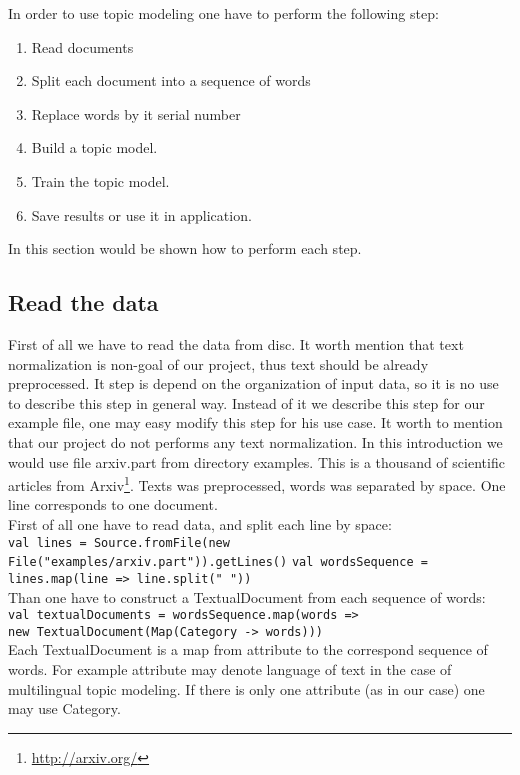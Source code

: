 In order to use topic modeling one have to perform the following step:
\begin{enumerate}
    \item Read documents
    \item Split each document into a sequence of words
    \item Replace words by it serial number
    \item Build a topic model.
    \item Train the topic model.
    \item Save results or use it in application. 
\end{enumerate}

In this section would be shown how to perform each step. 
\subsection{Read the data}
    First of all we have to read the data from disc. It worth mention that text normalization is non\--goal of our project, thus text should be already preprocessed. 
    It step is depend on the organization of input data, so it is
    no use to describe this step in general way. Instead of it we describe this step for our example file, one may easy modify this step for his use case. %
    It worth to mention that our project do not performs any text normalization.
    In this introduction we would use file arxiv.part from directory examples. This is a thousand of scientific articles
    from Arxiv\footnote{\url{http://arxiv.org/}}. Texts was preprocessed, words was separated by space. One line corresponds
    to one document.\\
    First of all one have to read data, and split each line by space:\\
    \texttt{val lines = Source.fromFile(new File("examples/arxiv.part")).getLines()}
    \texttt{val wordsSequence = lines.map(line => line.split(" "))}\\
    Than one have to construct a TextualDocument from each sequence of words:\\
    \texttt{val textualDocuments = wordsSequence.map(words => \\  new TextualDocument(Map(Category -> words)))}\\
    Each TextualDocument is a map from attribute to the correspond sequence of words. For example attribute may denote language of
    text in the case of multilingual topic modeling. If there is only one attribute (as in our case) one may use Category. 
